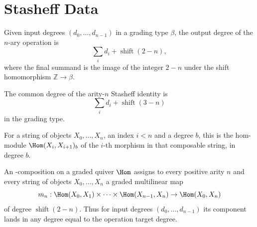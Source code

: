 
\chapter{Stasheff Data}

\begin{definition}
\label{AInfinityTheory.operationTargetDeg}
\leanok
{}
Given input degrees $(d_0,\dots,d_{n-1})$ in a grading type $\beta$, the
output degree of the $n$-ary operation is
\[
  \sum_i d_i + \operatorname{shift}(2-n),
\]
where the final summand is the image of the integer $2-n$ under the shift
homomorphism $\mathbb{Z} \to \beta$.
\end{definition}

\begin{definition}
\label{AInfinityTheory.stasheffTargetDeg}
\leanok
{}
The common degree of the arity-$n$ Stasheff identity is
\[
  \sum_i d_i + \operatorname{shift}(3-n)
\]
in the grading type.
\end{definition}

\begin{definition}
\label{AInfinityTheory.GradedLinearQuiver.ComposableHomType}
\leanok
{}
For a string of objects $X_0,\dots,X_n$, an index $i < n$ and a degree $b$,
this is the hom-module $\Hom(X_i, X_{i+1})_b$ of the $i$-th morphism in that
composable string, in degree $b$.
\end{definition}

\begin{definition}
\label{AInfinityTheory.AInfinityComposition}
\leanok
{}
An \Ainf{}-composition on a graded quiver $\Hom$ assigns to every positive arity
$n$ and every string of objects $X_0,\dots,X_n$ a graded multilinear map
\[
  m_n : \Hom(X_0,X_1) \times \cdots \times \Hom(X_{n-1},X_n) \to \Hom(X_0,X_n)
\]
of degree $\operatorname{shift}(2-n)$. Thus for input degrees
$(d_0,\dots,d_{n-1})$ its component lands in any degree equal to the operation
target degree.
\end{definition}

